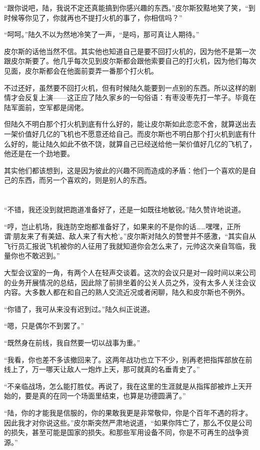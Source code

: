 “跟你说吧，陆，我说不定还真能搞到你感兴趣的东西。”皮尔斯狡黠地笑了笑，“到时候等你见了，你就再也不提打火机的事了，你相信吗？”

“呵呵。”陆久不以为然地冷笑了一声，“是吗，那可真让人期待。”

皮尔斯的话他当然不信。其实他也知道自己是要不回打火机的，因为他不是第一次跟皮尔斯要了。他几乎每次见到皮尔斯都会跟他索要自己的打火机，因为他们每次见面，皮尔斯都会在他面前耍弄一番那个打火机。

不过还好，虽然要不回打火机，但有时候陆久能要到一点别的东西。所以这样的剧情才会反复上演——这正应了陆久家乡的一句俗语：有枣没枣先打一竿子。毕竟在陆军面前，空军都是阔佬。

但陆久不明白那个打火机到底有什么好的，能让皮尔斯如此恋恋不舍，就算送出去一架价值好几亿的飞机也不愿意还给自己。而皮尔斯也不明白那个打火机到底有什么好的，能让陆久如此不依不饶，就算自己已经送给他一架价值好几亿的飞机了，他还是在一个劲地要。

其实他们都该想到，这是因为彼此的兴趣不同而造成的矛盾：他们一个喜欢的是自己的东西，而另一个喜欢的，则是别人的东西。
\section*{}

“不错，我还没到就把跑道准备好了，还是一如既往地敏锐。”陆久赞许地说道。

“哼，岂止机场，我连防空炮都准备好了，如果来的不是你的话……嘿嘿，正所谓‘朋友来了有美妞、敌人来了有大枪’。”皮尔斯对陆久的赞誉并不感激，“其实自从飞行员汇报说飞机被你的人征用了我就知道你会怎么来了，元帅这次亲自驾临，我量你也不敢迟到。”

大型会议室的一角，有两个人在轻声交谈着。这次的会议只是对一段时间以来公司的业务开展情况的总结，因此除了前排坐着的公关人员之外，没有太多人关注会议内容。大多数人都在和自己的熟人交流近况或者闲聊，陆久和皮尔斯也不例外。

“你错了，我可从来没有迟到过。”陆久纠正说道。

“嗯，只是偶尔不到罢了。”

“既然身在前线，我自然要一切以战事为重。”

“我看，你也差不多该撤回来了。这两年战功也立下不少，别再老把指挥部放在前线上了，万一哪天让敌人一炮炸上天，那可就真的名垂青史了。”

“不亲临战场，怎么能打胜仗。再说了，我在这里的生涯就是从指挥部被炸上天开始的，要是真的在同一个场面里结束，也算是功德圆满了。”

“陆，你的才能我是信服的，你的果敢我更是非常敬仰，你是个百年不遇的将才。因此我才对你说这些。”皮尔斯突然严肃地说道，“如果你阵亡了，那么不仅是公司的损失，甚至可能是国家的损失。和那些军用设备不同，你是不可再生的战争资源。”

